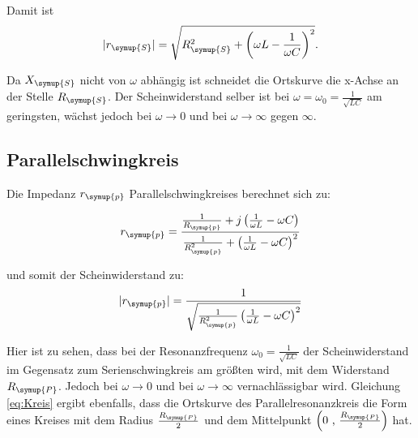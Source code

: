     \noindent Damit ist
    \begin{equation}
        |r_{\symup{S}}| = \sqrt{R^2_{\symup{S}} + \left( \omega L - \frac{1}{\omega C} \right)^2} . \nonumber
    \end{equation}

    \noindent Da $X_{\symup{S}}$ nicht von $\omega$ abhängig ist schneidet die Ortskurve die x-Achse an der Stelle $R_{\symup{S}}$. Der Scheinwiderstand 
    selber ist bei $\omega = \omega_0 = \frac{1}{\sqrt{LC}}$ am geringsten, wächst jedoch bei $\omega \to 0$ und bei $\omega \to \infty$ 
    gegen $\infty$.


        \subsection{Parallelschwingkreis}
    
    
        \noindent Die Impedanz $r_{\symup{p}}$ Parallelschwingkreises berechnet sich zu:
        
    \begin{equation}
        r_{\symup{p}} = \frac{\frac{1}{R_{\symup{p}}}+j \left( \frac{1}{\omega L} - \omega C \right)}{\frac{1}{R^2_{\symup{p}}}+ \left( \frac{1}{\omega L} - \omega C \right)^2}
        \label{eq:Kreis}
    \end{equation}

    \noindent und somit der Scheinwiderstand zu:
    \begin{equation}
        |r_{\symup{p}}|=  \frac{1}{\sqrt{\frac{1}{R^2_{\symup{p}}} \left( \frac{1}{\omega L} - \omega C \right)^2}} \nonumber
    \end{equation}

    Hier ist zu sehen, dass bei der Resonanzfrequenz $\omega_0 = \frac{1}{\sqrt{LC}}$ der Scheinwiderstand im Gegensatz zum 
    Serienschwingkreis am größten wird, mit dem Widerstand $R_{\symup{P}}$. Jedoch bei $\omega \to 0$ und bei $\omega \to \infty$ 
    vernachlässigbar wird. Gleichung \ref{eq:Kreis} ergibt ebenfalls, dass die Ortskurve des Parallelresonanzkreis die Form eines Kreises 
    mit dem Radius $\frac{R_{\symup{P}}}{2}$ und dem Mittelpunkt $\left( \text{0 , } \frac{R_{\symup{P}}}{2} \right)$ hat.